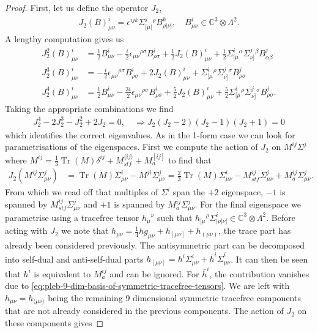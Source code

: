 \documentclass[10pt]{report}
\theoremstyle{definition}
\newcommand{\C}[0]{\mathbb{C}}
\DeclareMathOperator{\Tr}{Tr}
\newcommand{\E}[0]{\C^3}
\newcommand{\asd}[0]{\overline{\Sigma}}
\begin{document}
\begin{proof}
    First, let us define the operator $J_2$,
    \begin{align}
        J_2(B)^i_{\mu\nu} = \epsilon^{ijk} \Sigma^j_{[\mu|}{}^\rho B^k_{\rho|\nu]}, \quad B^i_{\mu\nu} \in \E \otimes \Lambda^2.
    \end{align}
    A lengthy computation gives us 
    \begin{align}
        J_2^2(B)^i_{\mu\nu} & = \frac{1}{2} B^i_{\mu\nu} - \frac{i}{2} \epsilon_{\mu\nu}{}^{\rho\sigma} B^i_{\rho\sigma} + \frac{1}{2} J_2(B)^i_{\mu\nu} + \frac{1}{2} \Sigma^i_{[\mu}{}^\alpha \Sigma^j_{\nu]}{}^\beta B^j_{\alpha\beta} \\
        J_2^3(B)^i_{\mu\nu} & = -\frac{i}{2} \epsilon_{\mu\nu}{}^{\rho\sigma} B^i_{\rho\sigma} + 2 J_2(B)^i_{\mu\nu} + \Sigma^i_{[\mu}{}^\rho \Sigma^j_{\nu]}{}^\sigma B^j_{\rho\sigma} \\
        J_2^4(B)^i_{\mu\nu} & = \frac{1}{2} B^i_{\mu\nu} - \frac{3i}{2} \epsilon_{\mu\nu}{}^{\rho\sigma} B^i_{\rho\sigma} + \frac{5}{2} J_2(B)^i_{\mu\nu} + \frac{5}{2} \Sigma^i_{[\mu}{}^\rho \Sigma^j_{\nu]}{}^\sigma B^j_{\rho\sigma}.
    \end{align}
    Taking the appropriate combinations we find 
    \begin{align}
        J_2^4 - 2 J_2^3 - J_2^2 + 2 J_2 = 0,\quad \Rightarrow J_2(J_2 - 2)(J_2 - 1)(J_2 + 1) = 0
    \end{align}
    which identifies the correct eigenvalues. As in the 1-form case we can look for parametrisations of the eigenspaces. First we compute the action of $J_2$ on $M^{ij} \Sigma^j$ where $M^{ij} = \frac{1}{3}\Tr(M) \delta^{ij} + M_{stf}^{\langle ij\rangle } + M_a^{[ij]}$ to find that 
    \begin{align}
        J_2(M^{ij} \Sigma^j_{\mu\nu}) & = \Tr(M) \Sigma^i_{\mu\nu} - M^{ji} \Sigma^j_{\mu\nu} = \frac{2}{3} \Tr(M) \Sigma^i_{\mu\nu} - M_{stf}^{ij} \Sigma^j_{\mu\nu} + M_a^{ij} \Sigma^j_{\mu\nu}.
    \end{align}
    From which we read off that multiples of $\Sigma^i$ span the $+2$ eigenspace, $-1$ is spanned by $M_{stf}^{ij} \Sigma^j_{\mu\nu}$ and $+1$ is spanned by $M_a^{ij} \Sigma^j_{\mu\nu}$. For the final eigenspace we parametrise using a tracefree tensor $h_\mu{}^\nu$ such that $h_{[\mu}{}^\rho \Sigma^i_{|\rho|\nu]} \in \E \otimes \Lambda^2$. Before acting with $J_2$ we note that $h_{\mu\nu} = \frac{1}{4}h g_{\mu\nu} + h_{[\mu\nu]} + h_{(\mu\nu)}$, the trace part has already been considered previously. The antisymmetric part can be decomposed into self-dual and anti-self-dual parts $h_{[\mu\nu]} = h^i \Sigma^i_{\mu\nu} + \bar{h}^i \asd^i_{\mu\nu}$. It can then be seen that $h^i$ is equivalent to $M_a^{ij}$ and can be ignored. For $\bar{h}^i$, the contribution vanishes due to \cref{eq:pleb-9-dim-basis-of-symmetric-tracefree-tensors}. We are left with $h_{\mu\nu} = h_{\langle \mu\nu\rangle }$ being the remaining 9 dimensional symmetric tracefree components that are not already considered in the previous components. The action of $J_2$ on these components gives

\end{proof}
\end{document}
